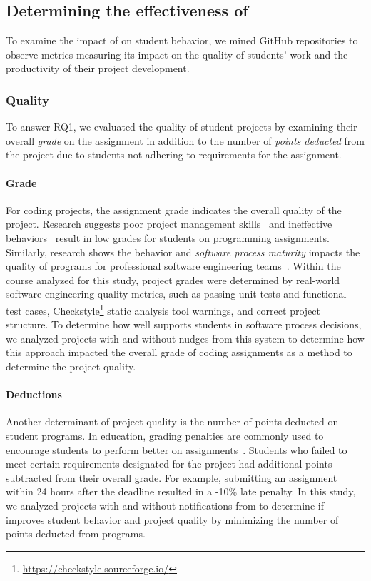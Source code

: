 \subsection{Determining the effectiveness of \tooltwo}

To examine the impact of \tooltwo on student behavior, we mined GitHub repositories to observe metrics measuring its impact on the quality of students' work and the productivity of their project development.

\subsubsection{Quality}

To answer RQ1, we evaluated the quality of student projects by examining their overall \textit{grade} on the assignment in addition to the number of \textit{points deducted} from the project due to students not adhering to requirements for the assignment.

\paragraph*{Grade}

For coding projects, the assignment grade indicates the overall quality of the project. Research suggests poor project management skills~\cite{beaubouef2005high} and ineffective behaviors~\cite{Edwards09Behaviors} result in low grades for students on programming assignments. Similarly, research shows the behavior and \textit{software process maturity} impacts the quality of programs for professional software engineering teams~\cite{Clark97theeffects}. Within the course analyzed for this study, project grades were determined by real-world software engineering quality metrics, such as passing unit tests and functional test cases, Checkstyle\footnote{\url{https://checkstyle.sourceforge.io/}} static analysis tool warnings, and correct project structure. To determine how well \tooltwo supports students in software process decisions, we analyzed projects with and without nudges from this system to determine how this approach impacted the overall grade of coding assignments as a method to determine the project quality.

\paragraph*{Deductions}

Another determinant of project quality is the number of points deducted on student programs. In education, grading penalties are commonly used to encourage students to perform better on assignments~\cite{Reeves2017SpecialTW}. Students who failed to meet certain requirements designated for the project had additional points subtracted from their overall grade. For example, submitting an assignment within 24 hours after the deadline resulted in a -10\% late penalty. In this study, we analyzed projects with and without notifications from \tooltwo to determine if \framework improves student behavior and project quality by minimizing the number of points deducted from programs.

